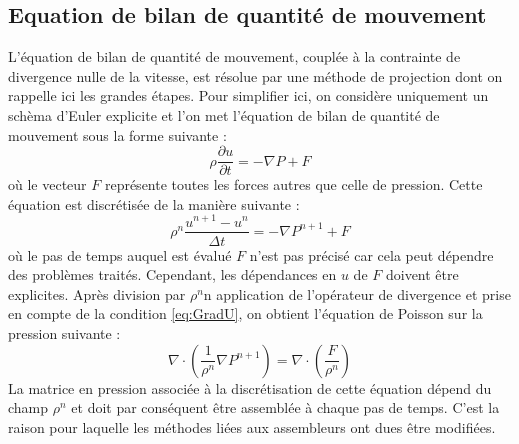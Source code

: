 \subsection{Equation de bilan de quantit\'e de mouvement}\label{subsec:EQ_bilan_QDM}
L'\'equation de bilan de quantit\'e de mouvement, coupl\'ee \`a la contrainte de divergence nulle de la vitesse, est r\'esolue par une m\'ethode
de projection dont on rappelle ici les grandes \'etapes. Pour simplifier ici, on consid\`ere uniquement un sch\`ema d'Euler explicite et l'on met
l'\'equation de bilan de quantit\'e de mouvement sous la forme suivante :
\begin{equation}
\rho\frac{\partial u}{\partial t}=-\nabla P + F
\end{equation}
o\`u le vecteur $F$ repr\'esente toutes les forces autres que celle de pression.\newline
Cette \'equation est discr\'etis\'ee de la mani\`ere suivante :
\begin{equation}
\rho^n \frac{u^{n+1}-u^n}{\Delta t}=-\nabla P^{n+1}+F
\end{equation}
o\`u le pas de temps auquel est \'evalu\'e $F$ n'est pas pr\'ecis\'e car cela peut d\'ependre des probl\`emes trait\'es. Cependant, les
d\'ependances en $u$ de $F$ doivent \^etre explicites.\newline
Apr\`es division par $\rho^n$n application de l'op\'erateur de divergence et prise en compte de la condition \ref{eq:GradU}, on obtient l'\'equation de Poisson
sur la pression suivante :
\begin{equation}
\nabla\cdot\left(\frac{1}{\rho^n}\nabla P^{n+1}\right)=\nabla\cdot\left(\frac{F}{\rho^n}\right)
\end{equation}
La matrice en pression associ\'ee \`a la discr\'etisation de cette \'equation d\'epend du champ $\rho^n$ et doit par cons\'equent \^etre
assembl\'ee \`a chaque pas de temps. C'est la raison pour laquelle les m\'ethodes li\'ees aux assembleurs ont dues \^etre modifi\'ees.



